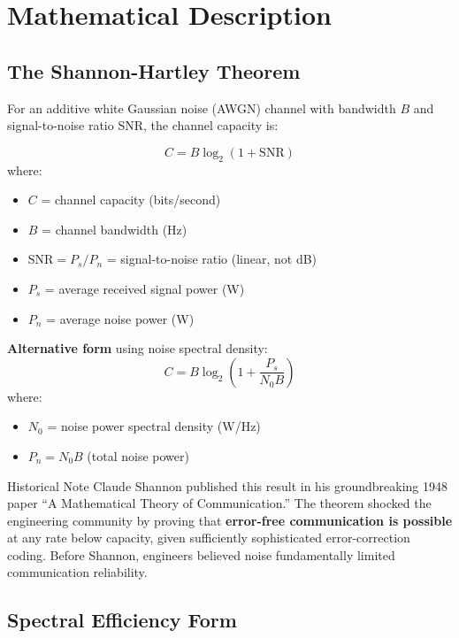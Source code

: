 \section{Mathematical Description}

\subsection{The Shannon-Hartley Theorem}

For an additive white Gaussian noise (AWGN) channel with bandwidth $B$ and signal-to-noise ratio SNR, the channel capacity is:

\begin{equation}
C = B \log_2(1 + \mathrm{SNR})
\label{eq:shannon-capacity}
\end{equation}
where:
\begin{itemize}
\item $C$ = channel capacity (bits/second)
\item $B$ = channel bandwidth (Hz)
\item $\mathrm{SNR} = P_s / P_n$ = signal-to-noise ratio (linear, not dB)
\item $P_s$ = average received signal power (W)
\item $P_n$ = average noise power (W)
\end{itemize}

\textbf{Alternative form} using noise spectral density:
\begin{equation}
C = B \log_2\left(1 + \frac{P_s}{N_0 B}\right)
\label{eq:shannon-capacity-n0}
\end{equation}
where:
\begin{itemize}
\item $N_0$ = noise power spectral density (W/Hz)
\item $P_n = N_0 B$ (total noise power)
\end{itemize}

\begin{calloutbox}{Historical Note}
Claude Shannon published this result in his groundbreaking 1948 paper ``A Mathematical Theory of Communication.'' The theorem shocked the engineering community by proving that \textbf{error-free communication is possible} at any rate below capacity, given sufficiently sophisticated error-correction coding. Before Shannon, engineers believed noise fundamentally limited communication reliability.
\end{calloutbox}

\subsection{Spectral Efficiency Form}

